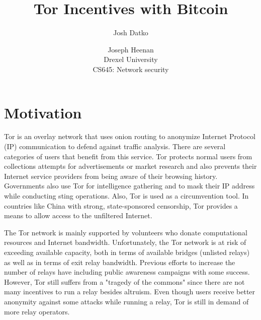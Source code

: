 \documentclass[letterpaper]{article}
\begin{document}
\setcounter{secnumdepth}{1}
\title{Tor Incentives with Bitcoin}
\author{Josh Datko \and Joseph Heenan\\ Drexel University\\
CS645: Network security\\
}
\maketitle

\section*{Motivation}\label{sec:motivation}
Tor is an overlay network that uses onion routing to anonymize
Internet Protocol (IP) communication to defend against traffic
analysis.  There are several categories of users that benefit from
this service.  Tor protects normal users from collections attempts for
advertisements or market research and also prevents their Internet
service providers from being aware of their browsing history.
Governments also use Tor for intelligence gathering and to mask their
IP address while conducting sting operations.  Also, Tor is used as a
circumvention tool\cite{tor-internet-days}.  In countries like China
with strong, state-sponsored censorship\cite{china-censorship}, Tor
provides a means to allow access to the unfiltered Internet.

The Tor network is mainly supported by volunteers who donate
computational resources and Internet bandwidth.  Unfortunately, the
Tor network is at risk of exceeding available capacity, both in terms
of available bridges (unlisted relays) as well as in terms of exit
relay bandwidth\cite{tor-internet-days}.  Previous efforts to increase
the number of relays have including public awareness
campaigns\cite{eff-campaign} with some success.  However, Tor still
suffers from a "tragedy of the commons\cite{Hardin_1968_Commons}"
since there are not many incentives to run a relay besides altruism.
Even though users receive better anonymity against some attacks while
running a relay\cite{better-anon-tor-relay}, Tor is still in demand of
more relay operators.
\end{document}
